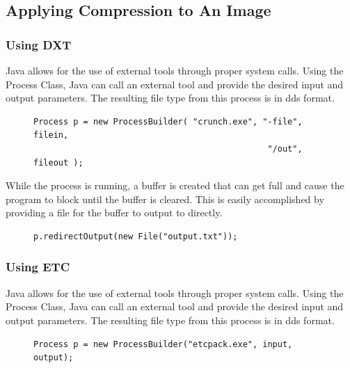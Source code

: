 \documentclass[12pt]{article}
\begin{document}
\subsection{Applying Compression to An Image}
\subsubsection{Using DXT}
Java allows for the use of external tools through proper system calls. Using the Process Class, Java can call an external tool and provide the desired input and output parameters. The resulting file type from this process is in dds format.

\begin{center}
\begin{figure}[!htbp]
\begin{verbatim}
Process p = new ProcessBuilder( "crunch.exe", "-file", filein,
                                               "/out", fileout );
\end{verbatim}
\end{figure}
\end{center}

While the process is running, a buffer is created that can get full and cause the program to block until the buffer is cleared. This is easily accomplished by providing a file for the buffer to output to directly.

\begin{center}
\begin{figure}[!htbp]
\begin{verbatim}
p.redirectOutput(new File("output.txt"));
\end{verbatim}
\end{figure}
\end{center}

\subsubsection{Using ETC}
Java allows for the use of external tools through proper system calls. Using the Process Class, Java can call an external tool and provide the desired input and output parameters. The resulting file type from this process is in dds format.

\begin{center}
\begin{figure}[!htbp]
\begin{verbatim}
Process p = new ProcessBuilder("etcpack.exe", input, output);
\end{verbatim}
\end{figure}
\end{center}
\end{document}
